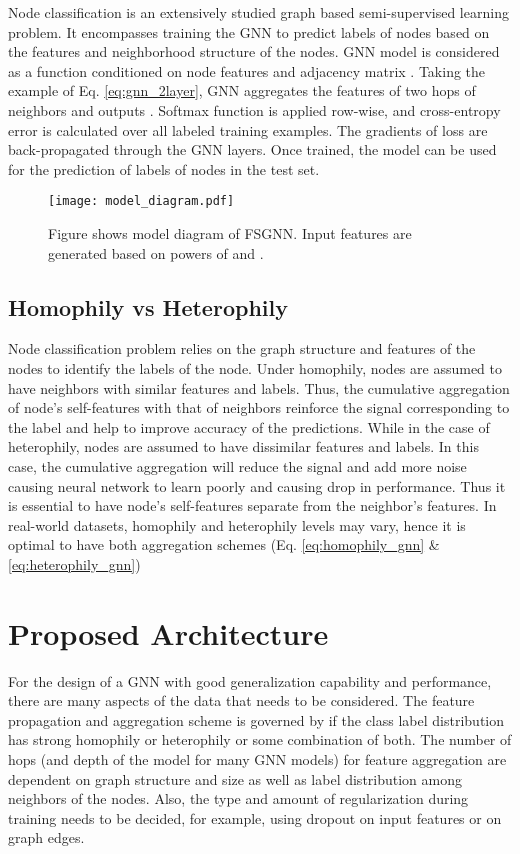 \documentclass[sigconf,natbib=false]{acmart}
\begin{document}
Node classification is an extensively studied graph based semi-supervised learning problem. It encompasses training the GNN to predict labels of nodes based on the features and neighborhood structure of the nodes. GNN model is considered as a function  conditioned on node features  and adjacency matrix . Taking the example of Eq. \ref{eq:gnn_2layer}, GNN aggregates the features of two hops of neighbors and outputs . Softmax function is applied row-wise, and cross-entropy error is calculated over all labeled training examples. The gradients of loss are back-propagated through the GNN layers. Once trained, the model can be used for the prediction of labels of nodes in the test set.

\begin{figure*}[h]
    \centering
    \texttt{[image: model\_diagram.pdf]}
    \caption{Figure shows model diagram of FSGNN. Input features are generated based on powers of  and .}
    \label{fig:model_diagram}
\end{figure*}

\subsection{Homophily vs Heterophily}
Node classification problem relies on the graph structure and features of the nodes to identify the labels of the node. Under homophily, nodes are assumed to have neighbors with similar features and labels. Thus, the cumulative aggregation of node's self-features with that of neighbors reinforce the signal corresponding to the label and help to improve accuracy of the predictions. While in the case of heterophily, nodes are assumed to have dissimilar features and labels. In this case, the cumulative aggregation will reduce the signal and add more noise causing neural network to learn poorly and causing drop in performance. Thus it is essential to have node's self-features separate from the neighbor's features. In real-world datasets, homophily and heterophily levels may vary, hence it is optimal to have both aggregation schemes (Eq. \ref{eq:homophily_gnn} \& \ref{eq:heterophily_gnn})

\section{Proposed Architecture}
\label{propose_arch}
For the design of a GNN with good generalization capability and performance, there are many aspects of the data that needs to be considered. The feature propagation and aggregation scheme is governed by if the class label distribution has strong homophily or heterophily or some combination of both. The number of hops (and depth of the model for many GNN models) for feature aggregation are dependent on graph structure and size as well as label distribution among neighbors of the nodes. Also, the type and amount of regularization during training needs to be decided, for example, using dropout on input features or on graph edges.
\end{document}

